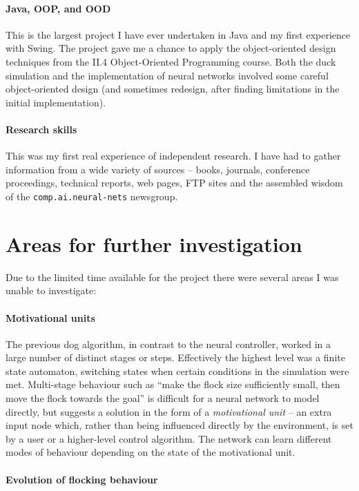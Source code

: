\documentclass[a4paper]{report}
\begin{document}
\paragraph{Java, OOP, and OOD} This is the largest project I
have ever undertaken in Java and my first experience with Swing. The
project gave me a chance to apply the object-oriented design
techniques from the II.4 Object-Oriented Programming course.  Both the
duck simulation and the implementation of neural networks involved
some careful object-oriented design (and sometimes redesign, after
finding limitations in the initial implementation).

\paragraph{Research skills} This was my first real experience of 
independent research. I have had to gather information from a wide
variety of sources -- books, journals, conference proceedings,
technical reports, web pages, FTP sites and the assembled wisdom of
the \texttt{comp.ai.neural-nets} newsgroup.

\section{Areas for further investigation}

Due to the limited time available for the project there were several
areas I was unable to investigate:

\paragraph{Motivational units} The previous dog algorithm, in contrast
to the neural controller, worked in a large number of distinct stages
or steps. Effectively the highest level was a finite state automaton,
switching states when certain conditions in the simulation were
met. Multi-stage behaviour such as ``make the flock size sufficiently
small, then move the flock towards the goal'' is difficult for a
neural network to model directly, but \cite{cecconi92} suggests a
solution in the form of a \emph{motivational unit} -- an extra input
node which, rather than being influenced directly by the environment,
is set by a user or a higher-level control algorithm. The network can
learn different modes of behaviour depending on the state of the
motivational unit.

\paragraph{Evolution of flocking behaviour}
\end{document}
